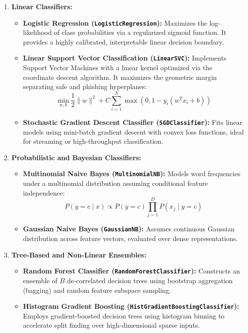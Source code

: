 \documentclass[conference]{IEEEtran}
\begin{document}
\begin{enumerate}
    \item \textbf{Linear Classifiers:}
    \begin{itemize}
        \item \textbf{Logistic Regression (\texttt{LogisticRegression}):} Maximizes the log-likelihood of class probabilities via a regularized sigmoid function. It provides a highly calibrated, interpretable linear decision boundary.
        \item \textbf{Linear Support Vector Classification (\texttt{LinearSVC}):} Implements Support Vector Machines with a linear kernel optimized via the coordinate descent algorithm. It maximizes the geometric margin separating safe and phishing hyperplanes:
        \begin{equation}
        \min_{w, b} \frac{1}{2} \|w\|^2 + C \sum_{i=1}^{N} \max\left(0, 1 - y_i (w^T x_i + b)\right)
        \end{equation}
        \item \textbf{Stochastic Gradient Descent Classifier (\texttt{SGDClassifier}):} Fits linear models using mini-batch gradient descent with convex loss functions, ideal for streaming or high-throughput classification.
    \end{itemize}

    \item \textbf{Probabilistic and Bayesian Classifiers:}
    \begin{itemize}
        \item \textbf{Multinomial Naive Bayes (\texttt{MultinomialNB}):} Models word frequencies under a multinomial distribution assuming conditional feature independence:
        \begin{equation}
        P(y = c \mid x) \propto P(y = c) \prod_{j=1}^{D} P(x_j \mid y = c)
        \end{equation}
        \item \textbf{Gaussian Naive Bayes (\texttt{GaussianNB}):} Assumes continuous Gaussian distribution across feature vectors, evaluated over dense representations.
    \end{itemize}

    \item \textbf{Tree-Based and Non-Linear Ensembles:}
    \begin{itemize}
        \item \textbf{Random Forest Classifier (\texttt{RandomForestClassifier}):} Constructs an ensemble of $B$ de-correlated decision trees using bootstrap aggregation (bagging) and random feature subspace sampling.
        \item \textbf{Histogram Gradient Boosting (\texttt{HistGradientBoostingClassifier}):} Employs gradient-boosted decision trees using histogram binning to accelerate split finding over high-dimensional sparse inputs.
    \end{itemize}
\end{enumerate}
\end{document}
